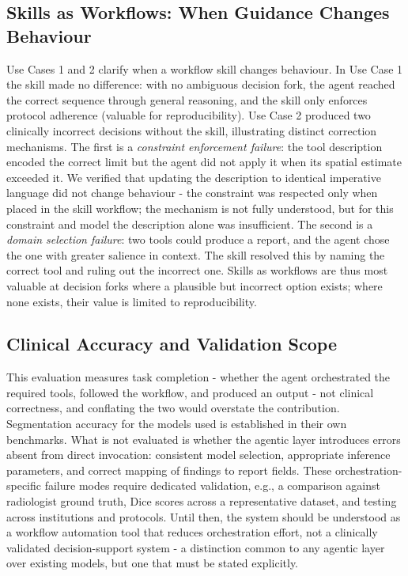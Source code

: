 \documentclass[preprint,12pt]{elsarticle}
\begin{document}
\subsection{Skills as Workflows: When Guidance Changes Behaviour}
Use Cases 1 and 2 clarify when a workflow skill changes behaviour. In Use Case 1 the skill made no difference: with no ambiguous decision fork, the agent reached the correct sequence through general reasoning, and the skill only enforces protocol adherence (valuable for reproducibility). Use Case 2 produced two clinically incorrect decisions without the skill, illustrating distinct correction mechanisms. The first is a \emph{constraint enforcement failure}: the tool description encoded the correct limit but the agent did not apply it when its spatial estimate exceeded it. We verified that updating the description to identical imperative language did not change behaviour - the constraint was respected only when placed in the skill workflow; the mechanism is not fully understood, but for this constraint and model the description alone was insufficient. The second is a \emph{domain selection failure}: two tools could produce a report, and the agent chose the one with greater salience in context. The skill resolved this by naming the correct tool and ruling out the incorrect one. Skills as workflows are thus most valuable at decision forks where a plausible but incorrect option exists; where none exists, their value is limited to reproducibility.

\subsection{Clinical Accuracy and Validation Scope}
This evaluation measures task completion - whether the agent orchestrated the required tools, followed the workflow, and produced an output - not clinical correctness, and conflating the two would overstate the contribution. Segmentation accuracy for the models used is established in their own benchmarks. What is not evaluated is whether the agentic layer introduces errors absent from direct invocation: consistent model selection, appropriate inference parameters, and correct mapping of findings to report fields. These orchestration-specific failure modes require dedicated validation, e.g., a comparison against radiologist ground truth, Dice scores across a representative dataset, and testing across institutions and protocols. Until then, the system should be understood as a workflow automation tool that reduces orchestration effort, not a clinically validated decision-support system - a distinction common to any agentic layer over existing models, but one that must be stated explicitly.
\end{document}
